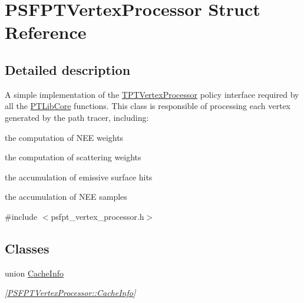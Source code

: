 \hypertarget{struct_p_s_f_p_t_vertex_processor}{}\section{P\+S\+F\+P\+T\+Vertex\+Processor Struct Reference}
\label{struct_p_s_f_p_t_vertex_processor}


\subsection{Detailed description}
A simple implementation of the \hyperlink{_p_t_lib_page_TPTVertexProcessor}{T\+P\+T\+Vertex\+Processor} policy interface required by all the \hyperlink{group___p_t_lib_core}{P\+T\+Lib\+Core} functions. This class is responsible of processing each vertex generated by the path tracer, including\+: \begin{DoxyParagraph}{}

\begin{DoxyItemize}
\item the computation of N\+EE weights
\item the computation of scattering weights
\item the accumulation of emissive surface hits
\item the accumulation of N\+EE samples 
\end{DoxyItemize}
\end{DoxyParagraph}


{\ttfamily \#include $<$psfpt\+\_\+vertex\+\_\+processor.\+h$>$}

\subsection*{Classes}
\begin{DoxyCompactItemize}
\item 
union \hyperlink{union_p_s_f_p_t_vertex_processor_1_1_cache_info}{Cache\+Info}
\begin{DoxyCompactList}\small\item\em \mbox{[}\hyperlink{union_p_s_f_p_t_vertex_processor_1_1_cache_info}{P\+S\+F\+P\+T\+Vertex\+Processor\+::\+Cache\+Info}\mbox{]} \end{DoxyCompactList}\end{DoxyCompactItemize}
